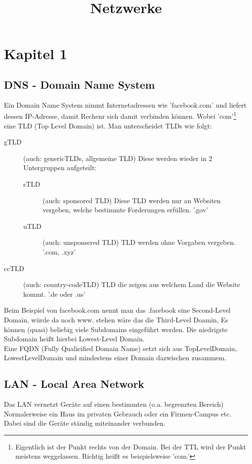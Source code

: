 \documentclass[a4paper,10pt]{scrartcl}
\title{Netzwerke}
\author{}
\date{}
\begin{document}
\maketitle
\newpage
\tableofcontents
\newpage
\section{Kapitel 1}
    \subsection{DNS - Domain Name System}
        Ein Domain Name System nimmt Internetadressen wie 'facebook.com' und liefert dessen IP-Adresse, 
        damit Rechenr sich damit verbinden können. Wobei 'com'\footnote{Eigentlich ist der Punkt rechts von der Domain. Bei der TTL wird der Punkt meistens weggelassen. Richtig heißt es beispielsweise 'com.'} eine TLD (Top Level Domain) ist. Man unterscheidet TLDs wie folgt:
        \begin{description}
            \item [gTLD] (auch: genericTLDs, allgemeine TLD) Diese werden wieder in 2 Untergruppen aufgeteilt:
                \begin{description}
                    \item [sTLD] (auch: sponsored TLD) Diese TLD werden nur an Websiten vergeben, welche bestimmte Forderungen erfüllen. '.gov'
                    \item [uTLD] (auch: unsponsered TLD) TLD werden ohne Vorgaben vergeben. '.com, .xyz' 
                \end{description} 
            \item [ccTLD] (auch: country-codeTLD) TLD die zeigen aus welchem Land die Website kommt. '.de oder .us'
        \end{description}
        Beim Beispiel von facebook.com nennt man das .facebook eine Second-Level Domain, würde da noch www. stehen wäre das die Third-Level Doamin,
        Es können (quasi) beliebig viele Subdomains eingeführt werden. Die niedrigste Subdomain heißt hierbei Lowest-Level Domain. \\
        Eine FQDN (Fully Qualieified Domain Name) setzt sich aus TopLevelDomain, LowestLevelDomain und mindestens einer Domain dazwischen zusammem.
    \subsection{LAN - Local Area Network}
        Das LAN vernetzt Geräte auf einen bestimmten (o.a. begrenzten Bereich) Normalerweise ein Haus im privaten Gebrauch oder ein Firmen-Campus etc. Dabei sind die Geräte 
        ständig miteinander verbunden. 
\end{document}
